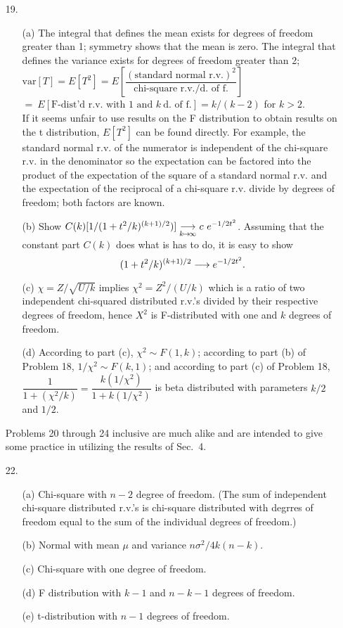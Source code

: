 \begin{enumerate}
	\newpage

	\item[19.]  \begin{enumerate}
		\item[(a)] The integral that defines the mean exists for degrees of freedom greater than 1; symmetry shows that the mean is zero. The integral that defines the variance exists for degrees of freedom greater than 2; \\
		$\mbox{var}[T] = E[T^2] = E[\dfrac{(\mbox{standard normal r.v.})^2}{\mbox{chi-square r.v./d.\ of f.}}]$ \\
		$=\ E[\mbox{F-dist'd r.v.\ with 1 and }k\ \mbox{d.\ of f.}] = k/(k-2)$ for $k>2$.	\\
		If it seems unfair to use results on the F distribution to obtain results on the t distribution, $E[T^2]$ can be found directly. For example, the standard normal r.v. of the numerator is independent of the chi-square r.v. in the denominator so the expectation can be factored into the product of the expectation of the square of a standard normal r.v. and the expectation of the reciprocal of a chi-square r.v. divide by degrees of freedom; both factors are known.
		\item[(b)] Show $C(k)[1/(1+t^2/k)^{(k+1)/2})] \underset {\tiny {k\! \to\! \infty}}{ \longrightarrow} c\ e^{-{\small 1/2}t^2}$.
		Assuming that the constant part $C(k)$ does what is has to do, it is easy to show 
		\[(1 + t^2/k)^{(k+1)/2} \longrightarrow e^{-{\small 1/2}t^2}. \]
		\item[(c)] $\chi = Z/\sqrt{U/k}$ implies $\chi^2=Z^2/(U/k)$ which is a ratio of two independent chi-squared distributed r.v.'s divided by their respective degrees of freedom, hence $X^2$ is F-distributed with one and $k$ degrees of freedom.
		\item[(d)] According to part (c), $\chi^2\sim F(1,k)$; according to part (b) of Problem 18, $1/\chi^2\sim F(k,1)$; and according to part (c) of Problem 18, $\dfrac{1}{1+(\chi^2/k)} = \dfrac{k(1/\chi^2)}{1+k(1/\chi^2)}$ is beta distributed with parameters $k/2$ and $1/2$.
	\end{enumerate}

Problems 20 through 24 inclusive are much alike and are intended to give some practice in utilizing the results of Sec.\ 4.

	\item[22.] \begin{enumerate}
		\item[(a)] Chi-square with $n-2$ degree of freedom. (The sum of independent chi-square distributed r.v.'s is chi-square distributed with degrres of freedom equal to the sum of the individual degrees of freedom.)	
		\item[(b)] Normal with mean $\mu$ and variance $n\sigma^2/4k(n-k)$.
		\item[(c)] Chi-square with one degree of freedom.
		\item[(d)] F distribution with $k-1$ and $n-k-1$ degrees of freedom.
		\item[(e)] t-distribution with $n-1$ degrees of freedom.
	\end{enumerate}


\end{enumerate}
